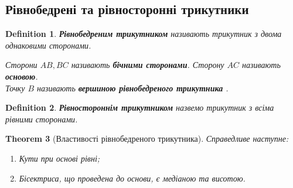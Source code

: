 \documentclass[a4paper, 10pt]{article}
\theoremstyle{theoremdd}
\newtheorem{theorem}{Theorem}[subsection]
\theoremstyle{theoremdd}
\theoremstyle{theoremdd}
\newtheorem{definition}[theorem]{Definition}
\theoremstyle{theoremdd}
\theoremstyle{theoremdd}
\theoremstyle{theoremdd}
\theoremstyle{theoremdd}
\theoremstyle{theoremdd}
\theoremstyle{theoremdd}
\begin{document}
\subsection{Рівнобедрені та рівносторонні трикутники}
\begin{definition}
\textbf{Рівнобедреним трикутником} називають трикутник з двома однаковими сторонами.
\begin{figure}[H]
\centering
{}
\end{figure}
Сторони $AB,BC$ називають \textbf{бічними сторонами}. Сторону $AC$ називають \textbf{основою}.\\
Точку $B$ називають \textbf{вершиною рівнобедреного трикутника} .
\end{definition}

\begin{definition}
\textbf{Рівностороннім трикутником} назвемо трикутник з всіма рівними сторонами.
\end{definition}

\begin{theorem}[Властивості рівнобедреного трикутника]
Справедливе наступне:
\begin{enumerate}[nosep,wide=0pt,label={\arabic*)}]
\item Кути при основі рівні;
\item Бісектриса, що проведена до основи, є медіаною та висотою.
\end{enumerate}
\end{theorem}
\end{document}
